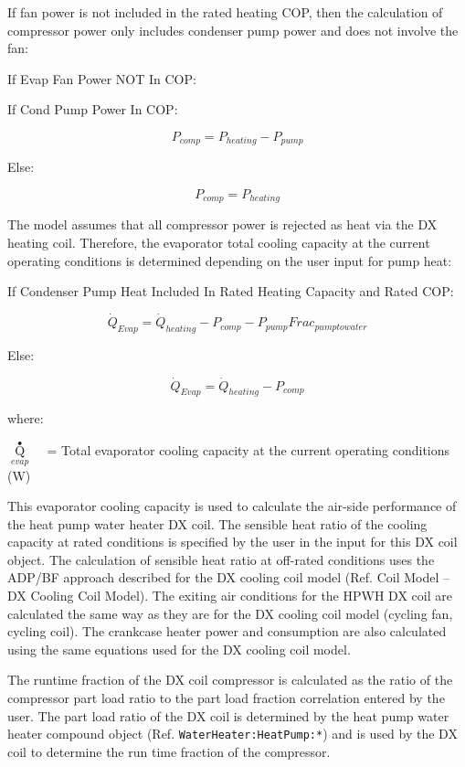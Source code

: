 If fan power is not included in the rated heating COP, then the calculation of compressor power only includes condenser pump power and does not involve the fan:

If Evap Fan Power NOT In COP:

  If Cond Pump Power In COP:

\begin{equation}
  P_{comp} = P_{heating}-P_{pump}
\end{equation}

Else:

\begin{equation}
  P_{comp} = P_{heating}
\end{equation}

The model assumes that all compressor power is rejected as heat via the DX heating coil. Therefore, the evaporator total cooling capacity at the current operating conditions is determined depending on the user input for pump heat:

If Condenser Pump Heat Included In Rated Heating Capacity and Rated COP:

\begin{equation}
  \dot{Q}_{Evap} = \dot{Q}_{heating} - P_{comp} - P_{pump}Frac_{pumptowater}
\end{equation}

Else:

\begin{equation}
  \dot{Q}_{Evap} = \dot{Q}_{heating} - P_{comp}
\end{equation}

where:

\({\mathop Q\limits^ \bullet_{evap}}\) ~ = Total evaporator cooling capacity at the current operating conditions (W)

This evaporator cooling capacity is used to calculate the air-side performance of the heat pump water heater DX coil. The sensible heat ratio of the cooling capacity at rated conditions is specified by the user in the input for this DX coil object. The calculation of sensible heat ratio at off-rated conditions uses the ADP/BF approach described for the DX cooling coil model (Ref. Coil Model -- DX Cooling Coil Model). The exiting air conditions for the HPWH DX coil are calculated the same way as they are for the DX cooling coil model (cycling fan, cycling coil). The crankcase heater power and consumption are also calculated using the same equations used for the DX cooling coil model.

The runtime fraction of the DX coil compressor is calculated as the ratio of the compressor part load ratio to the part load fraction correlation entered by the user. The part load ratio of the DX coil is determined by the heat pump water heater compound object (Ref. \lstinline!WaterHeater:HeatPump:*!) and is used by the DX coil to determine the run time fraction of the compressor.

